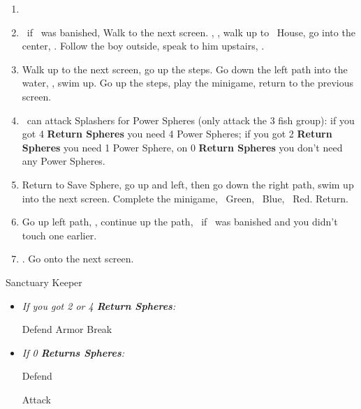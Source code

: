 \begin{enumerate}[resume]
    \item \formation{\tidus}{\kimahri}{\auron}
    \item \save\ if \bahamut\ was banished, Walk to the next screen. \skippablefmv[0:20], \sd, walk up to \tidus\ House, go into the center, \sd. Follow the boy outside, speak to him upstairs, \sd.
    \item Walk up to the next screen, go up the steps. Go down the left path into the water, \sd, swim up. Go up the steps, play the minigame, return to the previous screen.
    \item \tidus\ can attack Splashers for Power Spheres (only attack the 3 fish group): if you got 4 \textbf{Return Spheres} you need 4 Power Spheres; if you got 2 \textbf{Return Spheres} you need 1 Power Sphere, on 0 \textbf{Return Spheres} you don't need any Power Spheres.
    \item Return to Save Sphere, go up and left, then go down the right path, swim up into the next screen. Complete the minigame, \rikku\ Green, \tidus\ Blue, \wakka\ Red. Return.
    \item Go up left path, \sd, continue up the path, \save\ if \bahamut\ was banished and you didn't touch one earlier.
    \item \formation{\tidus}{\yuna}{\wakka}. Go onto the next screen.
\end{enumerate}
\bothvfill
\winvfill
\lossvfill
\begin{battle}[40000]{Sanctuary Keeper}
    \begin{itemize}
        \item \textit{If you got 2 or 4 \textbf{Return Spheres}:}
            \begin{itemize}
                \yunaf Defend
                \tidusf Armor Break
            \end{itemize}
        \item \textit{If 0 \textbf{Returns Spheres}:}
            \begin{itemize}
                \tidusf Defend
            \end{itemize}
        \summon{\bahamut}
        \bahamutf Attack
    \end{itemize}
\end{battle}
